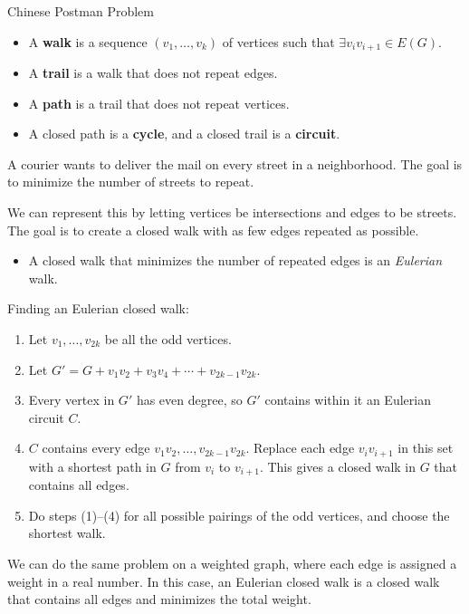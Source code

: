 \documentclass[10pt]{extarticle}
\begin{document}
  \begin{problem}{Chinese Postman Problem}
    \begin{itemize}
      \item A \textbf{walk} is a sequence $(v_1,\dots,v_k)$ of vertices such that $\exists v_{i}v_{i+1}\in E(G)$.
      \item A \textbf{trail} is a walk that does not repeat edges.
      \item A \textbf{path} is a trail that does not repeat vertices.
      \item A closed path is a \textbf{cycle}, and a closed trail is a \textbf{circuit}.
    \end{itemize}
    A courier wants to deliver the mail on every street in a neighborhood. The goal is to minimize the number of streets to repeat.\newline

    We can represent this by letting vertices be intersections and edges to be streets. The goal is to create a closed walk with as few edges repeated as possible.
    \begin{itemize}
      \item A closed walk that minimizes the number of repeated edges is an \textit{Eulerian} walk.
    \end{itemize}
    \begin{problem}{Finding an Eulerian closed walk:}
      \begin{enumerate}[(1)]
        \item Let $v_1,\dots,v_{2k}$ be all the odd vertices.
        \item Let $G' = G + v_1v_2 + v_3v_4 + \cdots + v_{2k-1}v_{2k}$.
        \item Every vertex in $G'$ has even degree, so $G'$ contains within it an Eulerian circuit $C$.
        \item $C$ contains every edge $v_1v_2,\dots,v_{2k-1}v_{2k}$. Replace each edge $v_{i}v_{i+1}$ in this set with a shortest path in $G$ from $v_i$ to $v_{i+1}$. This gives a closed walk in $G$ that contains all edges.
        \item Do steps (1)--(4) for all possible pairings of the odd vertices, and choose the shortest walk.
      \end{enumerate}
    \end{problem}
    We can do the same problem on a weighted graph, where each edge is assigned a weight in a real number. In this case, an Eulerian closed walk is a closed walk that contains all edges and minimizes the total weight.
  \end{problem}
\end{document}

